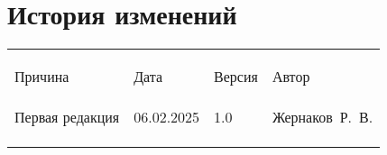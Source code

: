 
\def \notincludehead{}
\def \maindoc{}








\section*{История изменений}
\noindent

\scriptsize
\begin{longtable}{|p{40mm}|p{20mm}|p{20mm}|p{60mm}|}
\hline
{\bf \parbox[c][5mm]{40mm}{\raggedright Причина}} & {\bf \parbox[c]{19mm}{\raggedright Дата}} & {\bf \parbox[c]{16mm}{\raggedright Версия}} & {\bf \parbox[c]{25mm}{\raggedright Автор}} \\
\parbox[c][9mm]{40mm}{Первая редакция} & \parbox{19mm}{06.02.2025} & \parbox{16mm}{1.0} & \parbox{25mm}{Жернаков~Р.~В.} \\
\hline
\hline
&&&\\
\hline
&&&\\
\hline
&&&\\
\hline
\end{longtable}  
\normalsize

\newpage

\footnotesize
\tableofcontents
\normalsize
\newpage








